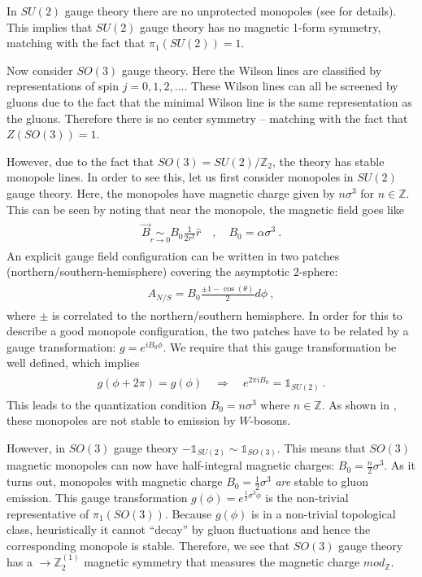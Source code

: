 \documentclass[11pt]{article}
\newcommand{\eq}[1]{\begin{align}\begin{split}#1\end{split}\end{align}}
\def\half{\frac{1}{2}}
\def\IZ{{\mathbb{Z}}}
\begin{document}
In $SU(2)$ gauge theory there are no unprotected monopoles (see \cite{Brandt:1979kk,Coleman:1982cx} for details). This implies that  $SU(2)$ gauge theory has no magnetic 1-form  symmetry, matching with the fact that $\pi_1(SU(2))=1$. 
\bigskip

Now consider $SO(3)$ gauge theory. Here the Wilson lines are classified by representations of spin $j=0,1,2,...$. These Wilson lines can all be screened by gluons due to the fact that the minimal Wilson line is the same representation as the gluons. Therefore there is no center symmetry -- matching with the fact that $Z(SO(3))=1$. 

However, due to the fact that $SO(3)=SU(2)/\IZ_2$, the theory has stable  monopole lines. 
In order to see this, let us first consider monopoles in $SU(2)$ gauge theory.  
Here, the monopoles have magnetic charge given by $n\sigma^3$ for $n\in \IZ$. This can be seen by noting that near the monopole, the magnetic field goes like 
\eq{
\vec{B}\underset{r\to 0}{\sim} B_0\frac{1}{2r^2}\hat{r}\quad, \quad B_0=\alpha \sigma^3~.}
An explicit gauge field configuration can be written in two patches (northern/southern-hemisphere) covering the asymptotic 2-sphere:
\eq{A_{N/S}=B_0\frac{\pm 1-\cos(\theta)}{2}d\phi~,
}
where $\pm$ is correlated to the northern/southern hemisphere. In order for this to describe a good monopole configuration, the two patches have to be related by a gauge transformation: $g=e^{i B_0 \phi}$. We require that this gauge transformation be well defined, which implies
\eq{ 
g(\phi+2\pi)=g(\phi)\quad\Rightarrow \quad e^{2\pi i B_0}=\mathds{1}_{SU(2)}~.
}
This leads to the quantization condition $B_0=n \sigma^3$ where $n \in \IZ$. 
As shown in \cite{Brandt:1979kk,Coleman:1982cx}, these monopoles are not stable to emission by $W$-bosons. 

However, in $SO(3)$ gauge theory $-\mathds{1}_{SU(2)}\sim \mathds{1}_{SO(3)}$. This means that $SO(3)$ magnetic monopoles can now have half-integral magnetic charges: $B_0=\frac{n}{2}\sigma^3$. As it turns out,   monopoles with magnetic charge $B_0=\half \sigma^3$  \emph{are} stable to gluon emission. This gauge transformation $g(\phi)=e^{\half \sigma^3 \phi}$ is the non-trivial representative of $\pi_1(SO(3))$. Because  $g(\phi)$ is in a non-trivial topological class, heuristically it cannot ``decay'' by gluon fluctuations and hence the corresponding monopole is stable. Therefore, we see that $SO(3)$ gauge theory has a  $\to \IZ_2^{(1)}$ magnetic  symmetry that measures the magnetic charge $mod_\IZ$.  
\end{document}
